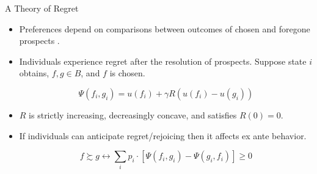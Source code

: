 \documentclass[aspectratio=169]{beamer}
\begin{document}
\begin{frame}{A Theory of Regret}

	\begin{itemize}

		\item Preferences depend on comparisons between outcomes of chosen and foregone prospects \parencite{bell_risk_1983,loomes_regret_1982}.

		\item Individuals experience regret after the resolution of prospects. Suppose state $i$ obtains, $f, g \in B$, and $f$ is chosen.

			\[ \Psi(f_i, g_i) = u(f_i) + \gamma R(u(f_i) - u(g_i)) \]

		\item $R$ is strictly increasing, decreasingly concave, and satisfies $R(0) = 0$.

		\item If individuals can anticipate regret/rejoicing then it affects ex ante behavior.

		\[ f \succsim g \leftrightarrow \sum_i p_{i} \cdot [\Psi(f_i, g_i) - \Psi(g_i, f_i)] \geq 0 \]




	\end{itemize}
	
\end{frame}
\end{document}
